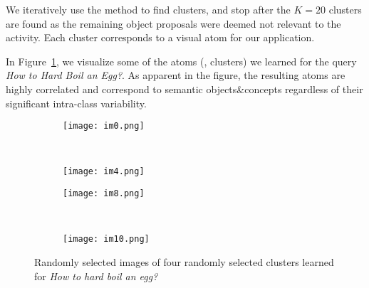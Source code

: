 We iteratively use the method to find clusters, and stop after the $K=20$ clusters are found as the remaining object proposals were deemed not relevant to the activity. Each cluster corresponds to a visual atom for our application.

In Figure~\ref{cvis}, we visualize some of the atoms (\ie, clusters) we learned for the query \emph{How to Hard Boil an Egg?}. As apparent in the figure, the resulting atoms are highly correlated and correspond to semantic objects\&concepts regardless of their significant intra-class variability.
\begin{figure}[ht]
  \begin{subfigure}[b]{0.23\textwidth}
\texttt{[image: im0.png]}
\end{subfigure}
~
\begin{subfigure}[b]{0.23\textwidth}
\texttt{[image: im4.png]}
\end{subfigure}


\begin{subfigure}[b]{0.23\textwidth}
\texttt{[image: im8.png]}
\end{subfigure}
~
\begin{subfigure}[b]{0.23\textwidth}
\texttt{[image: im10.png]}
\end{subfigure}
\vspace{-5mm}
\caption{Randomly selected images of four randomly selected clusters learned for \emph{How to hard boil an egg?}}
\label{cvis}
\vspace{-4mm}
\end{figure}
